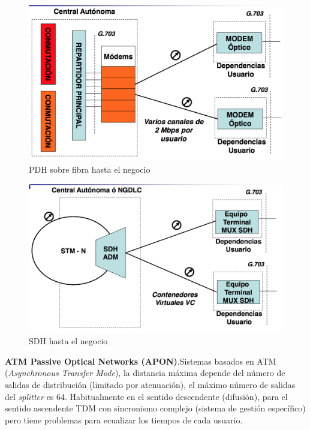 \documentclass[10pt,portrait, twocolumn]{article}
\makeatletter
\renewcommand{\subsubsection}{\@startsection{subsubsection}{3}{0mm}%
                                {-1ex plus -.5ex minus -.2ex}%
                                {1ex plus .2ex}%
                                {\normalfont\small\bfseries}}
\makeatother
\begin{document}
	\begin{figure}[!ht]
 		\centering
  		 \includegraphics[scale = 0.4]{images/PDHSobreFibra}
		\caption{PDH sobre fibra hasta el negocio}
	\end{figure}



	\begin{figure}[!ht]
 		\centering
  		 \includegraphics[scale = 0.4]{images/SDHNegocio}
		\caption{SDH hasta el negocio}
	\end{figure}
	

\textbf{ATM Passive Optical Networks (APON)}.Sistemas basados en ATM (\textit{Asynchronous Transfer Mode}), la distancia máxima depende del número de salidas de distribución (limitado por atenuación), el máximo número de salidas del \textit{splitter} es 64. Habitualmente en el sentido descendente (difusión), para el sentido ascendente TDM con sincronismo complejo (sistema de gestión específico) pero tiene problemas para ecualizar los tiempos de cada usuario.
	
\end{document}
